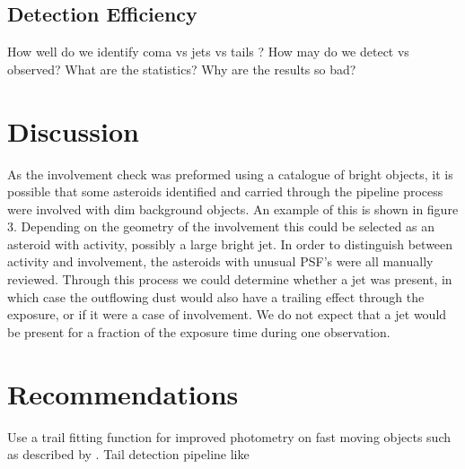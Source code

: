 \documentclass[iop,apj]{emulateapj}
\begin{document}
\subsection{Detection Efficiency}

How well do we identify coma vs jets vs tails ? How may do we detect vs observed? What are the statistics? Why are the results so bad?

\section{Discussion}

As the involvement check was preformed using a catalogue of bright objects, it is possible that some asteroids identified and carried through the pipeline process were involved with dim background objects. An example of this is shown in figure 3. Depending on the geometry of the involvement this could be selected as an asteroid with activity, possibly a large bright jet. In order to distinguish between activity and involvement, the asteroids with unusual PSF's were all manually reviewed. Through this process we could determine whether a jet was present, in which case the outflowing dust would also have a trailing effect through the exposure, or if it were a case of involvement. We do not expect that a jet would be present for a fraction of the exposure time during one observation. 

\section{Recommendations }

Use a trail fitting function for improved photometry on fast moving objects such as described by \cite{veres12}.
Tail detection pipeline like \cite{sonnett11}




\end{document}

